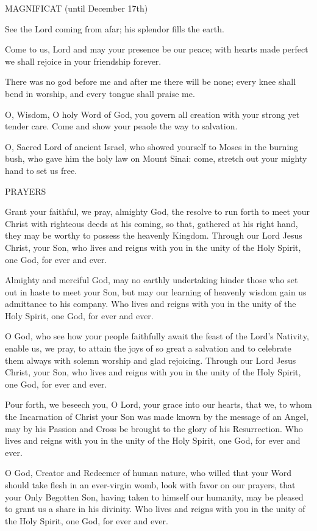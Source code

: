 \noindent\small{\uppercase{Magnificat} (until December 17th)}
\begin{description}[labelindent=\parindent, leftmargin=*]
\item [1.] See the Lord coming from afar; his splendor fills the earth.
\item [2.] Come to us, Lord and may your presence be our peace; with hearts made perfect we shall rejoice in your friendship forever.
\item [3.] There was no god before me and after me there will be none; every knee shall bend in worship, and every tongue shall praise me.
\item [(December 17th)]
   O, Wisdom, O holy Word of God, you govern all creation with your strong yet tender care. Come and show your peaole the way to salvation.
\item [(December 18th)]
   O, Sacred Lord of ancient Israel, who showed yourself to Moses in the burning bush, who gave him the holy law on Mount Sinai: come, stretch out your mighty hand to set us free.
\end{description}
\noindent\small{\uppercase{Prayers}}
\begin{description}[labelindent=\parindent,leftmargin=*]
\item [Week 1] Grant your faithful, we pray, almighty God, the resolve to run forth to meet your Christ with righteous deeds at his coming, so that, gathered at his right hand, they may be worthy to possess the heavenly Kingdom. Through our Lord Jesus Christ, your Son, who lives and reigns with you in the unity of the Holy Spirit, one God, for ever and ever.
\item [Week 2] Almighty and merciful God, may no earthly undertaking hinder those who set out in haste to meet your Son, but may our learning of heavenly wisdom gain us admittance to his company. Who lives and reigns with you in the unity of the Holy Spirit, one God, for ever and ever.
\item [Week 3] O God, who see how your people faithfully await the feast of the Lord's Nativity, enable us, we pray, to attain the joys of so great a salvation and to celebrate them always with solemn worship and glad rejoicing. Through our Lord Jesus Christ, your Son, who lives and reigns with you in the unity of the Holy Spirit, one God, for ever and ever.
\item [Week 4] Pour forth, we beseech you, O Lord, your grace into our hearts, that we, to whom the Incarnation of Christ your Son was made known by the message of an Angel, may by his Passion and Cross be brought to the glory of his Resurrection. Who lives and reigns with you in the unity of the Holy Spirit, one God, for ever and ever.
\item [December 17th] O God, Creator and Redeemer of human nature, who willed that your Word should take flesh in an ever-virgin womb, look with favor on our prayers, that your Only Begotten Son, having taken to himself our humanity, may be pleased to grant us a share in his divinity. Who lives and reigns with you in the unity of the Holy Spirit, one God, for ever and ever.
\end{description}


